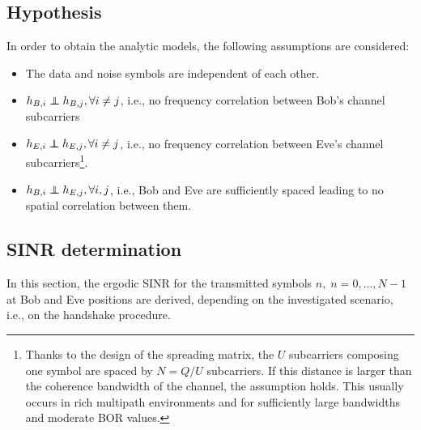 \documentclass[journal,comsoc]{IEEEtran}
\newcommand\independent{\protect\mathpalette{\protect\independenT}{\perp}}
\def\independenT#1#2{\mathrel{\rlap{$#1#2$}\mkern2mu{#1#2}}}
\begin{document}

\subsection{Hypothesis}
In order to obtain the analytic models, the following assumptions are considered:
\begin{itemize}
	\item The data and noise symbols are independent of each other. 
	\item $h_{B,i} \independent h_{B,j}, \forall i \neq j$, i.e., no frequency correlation between Bob's channel subcarriers
	\item $h_{E,i} \independent h_{E,j}, \forall i \neq j$, i.e., no frequency correlation between Eve's channel subcarriers\footnote{Thanks to the design of the spreading matrix, the $U$ subcarriers composing one symbol are spaced by $N = Q/U$ subcarriers. If this distance is larger than the coherence bandwidth of the channel, the assumption holds. This usually occurs in rich multipath environments and for sufficiently large bandwidths and moderate BOR values.}.
	\item $h_{B,i} \independent h_{E,j}, \forall i,j$, i.e., Bob and Eve are sufficiently spaced leading to no spatial correlation between them.
\end{itemize}


\subsection{SINR determination}
In this section, the ergodic SINR for the transmitted symbols $n, \; n = 0,...,N-1$ at Bob and Eve positions are derived, depending on the investigated scenario, i.e., on the handshake procedure. 



\end{document}
